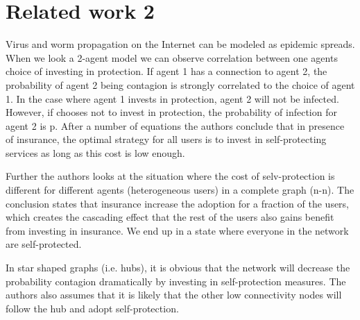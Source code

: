 \chapter{Related work 2}
\label{chp:relatedwork2} 


Virus and worm propagation on the Internet can be modeled as epidemic spreads. 
When we look a 2-agent model we can observe correlation between one agents choice of investing in 
protection. If agent 1 has a connection to agent 2, the probability of agent 2 being contagion is 
strongly correlated to the choice of agent 1. In the case where agent 1 invests in protection,
 agent 2 will not be infected. However, if chooses not to invest in protection, the probability 
 of infection for agent 2 is p.
 After a number of equations the authors conclude that in presence of insurance, the optimal 
 strategy for all users is to invest in self-protecting services as long as this cost is low
  enough.

Further the authors looks at the situation where the cost of selv-protection is different for 
different agents (heterogeneous users) in a complete graph (n-n). The conclusion states that
 insurance increase the adoption for a fraction of the users, which creates the cascading effect
 that the rest of the users also gains benefit from investing in insurance. We end up in a state
  where everyone in the network are self-protected. 

In star shaped graphs (i.e. hubs), it is obvious that the network will decrease the probability
 contagion dramatically by investing in self-protection measures. The authors also assumes that it
 is likely that the other low connectivity nodes will follow the hub and adopt self-protection. 
